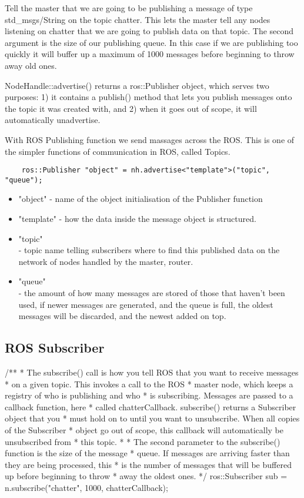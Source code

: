     Tell the master that we are going to be publishing a message of type std\_msgs/String on the topic chatter. This lets the master tell any nodes listening on chatter that we are going to publish data on that topic. The second argument is the size of our publishing queue. In this case if we are publishing too quickly it will buffer up a maximum of 1000 messages before beginning to throw away old ones.

    NodeHandle::advertise() returns a ros::Publisher object, which serves two purposes: 1) it contains a publish() method that lets you publish messages onto the topic it was created with, and 2) when it goes out of scope, it will automatically unadvertise. 

\fi

With ROS Publishing function we send massages across the ROS. This is one of the simpler functions of communication in ROS, called Topics. %

\begin{lstlisting}
    ros::Publisher "object" = nh.advertise<"template">("topic", "queue");
\end{lstlisting}
\begin{itemize}
\setlength{\itemsep}{0.05\baselineskip}
    \item "object" - name of the object initialisation of the Publisher function 
    \item "template" - how the data inside the message object is structured.
    \item "topic"\\- topic name telling subscribers where to find this published data on the network of nodes handled by the master, router.
    \item "queue"\\- the amount of how many messages are stored of those that haven't been used, if newer messages are generated, and the queue is full, the oldest messages will be discarded, and the newest added on top.
\end{itemize}

\subsection{ROS Subscriber}

\iffalse
  /**
   * The subscribe() call is how you tell ROS that you want to receive messages
   * on a given topic.  This invokes a call to the ROS
   * master node, which keeps a registry of who is publishing and who
   * is subscribing.  Messages are passed to a callback function, here
   * called chatterCallback.  subscribe() returns a Subscriber object that you
   * must hold on to until you want to unsubscribe.  When all copies of the Subscriber
   * object go out of scope, this callback will automatically be unsubscribed from
   * this topic.
   *
   * The second parameter to the subscribe() function is the size of the message
   * queue.  If messages are arriving faster than they are being processed, this
   * is the number of messages that will be buffered up before beginning to throw
   * away the oldest ones.
   */
  ros::Subscriber sub = n.subscribe("chatter", 1000, chatterCallback);
  

